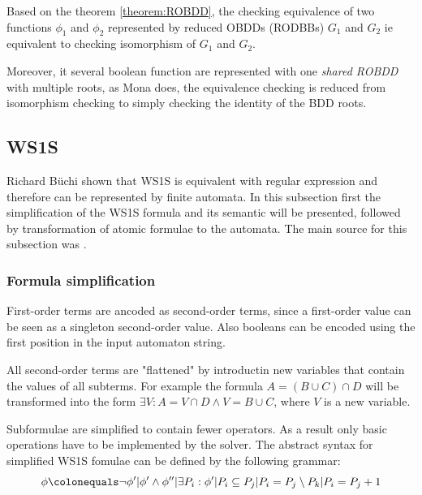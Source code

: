 \documentclass[pdflatex,sn-mathphys-num]{sn-jnl}%
\theoremstyle{thmstyleone}%
\theoremstyle{thmstyletwo}%
\theoremstyle{thmstylethree}%
\begin{document}
        \vspace*{0.5em}

        Based on the theorem \ref{theorem:ROBDD}, the checking equivalence of two functions $\phi_1$ and $\phi_2$ represented by reduced OBDDs (RODBBs) $G_1$ and $G_2$ ie equivalent to checking isomorphism of $G_1$ and $G_2$.

        Moreover, it several boolean function are represented with one \textit{shared ROBDD} with multiple roots, as Mona does, the equivalence checking is reduced from isomorphism checking to simply checking the identity of the BDD roots.


    \subsection{WS1S}
        Richard Büchi shown that WS1S is equivalent with regular expression and therefore can be represented by finite automata\cite{Buchi}. In this subsection first the simplification of the WS1S formula and its semantic will be presented, followed by transformation of atomic formulae to the automata. The main source for this subsection was \cite{Mona_manual}.

        \subsubsection*{Formula simplification}
            First-order terms are ancoded as second-order terms, since a first-order value can be seen as a singleton second-order value. Also booleans can be encoded using the first position in the input automaton string.

            All second-order terms are "flattened" by introductin new variables that contain the values of all subterms. For example the formula $A = (B \cup C) \cap D$ will be transformed into the form $\exists V : A = V \cap D \land V = B \cup C$, where $V$ is a new variable.

            Subformulae are simplified to contain fewer operators. As a result only basic operations have to be implemented by the solver. The abstract syntax for simplified WS1S fomulae can be defined by the following grammar:
            $$
                \phi \colonequals \neg \phi' | \phi' \land \phi'' | \exists P_i : \phi' | P_i \subseteq P_j | P_i = P_j \setminus P_k | P_i = P_j + 1
            $$
\end{document}
